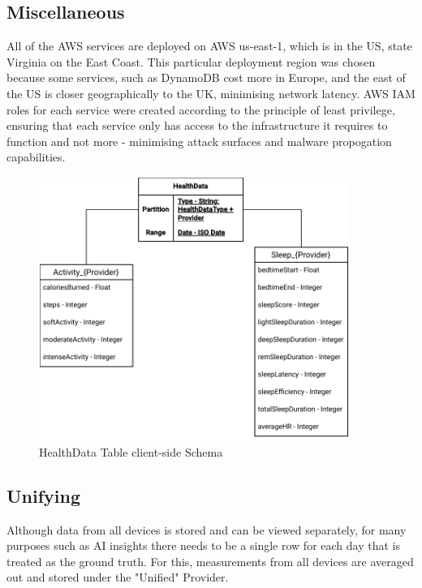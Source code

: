 \subsection{Miscellaneous}
All of the AWS services are deployed on AWS us-east-1, which is in the US, state Virginia on the East Coast. This particular deployment region was chosen because some services, such as DynamoDB cost more in Europe, and the east of the US is closer geographically to the UK, minimising network latency. AWS IAM roles for each service were created according to the principle of least privilege, ensuring that each service only has access to the infrastructure it requires to function and not more - minimising attack surfaces and malware propogation capabilities.
\begin{figure}
    
    \centering
    \includegraphics[width=0.9\textwidth,height=\textheight,keepaspectratio]{../images/dataSchema.pdf}
    \caption{HealthData Table client-side Schema}
    \label{fig:schema}
    
\end{figure}
\subsection{Unifying}
Although data from all devices is stored and can be viewed separately, for many purposes such as AI insights there needs to be a single row for each day that is treated as the ground truth. For this, measurements from all devices are averaged out and stored under the "Unified" Provider. 
